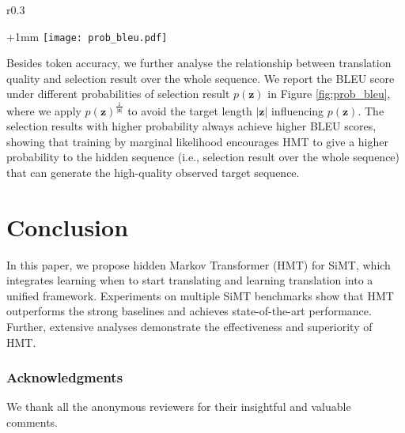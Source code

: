 \documentclass{article} %
\begin{document}
\setlength{\columnsep}{10pt}
\begin{wrapfigure}{r}{0.3\textwidth}
\begin{center}
\advance\leftskip+1mm
  \vspace{-0.3in} 
 \texttt{[image: prob\_bleu.pdf]}
   \vspace{-0.05in} 
  \caption{BLEU score with probability of selection result.}\label{fig:prob_bleu}
\vspace{-0.3in} 
\end{center}
\end{wrapfigure}
Besides token accuracy, we further analyse the relationship between translation quality and selection result over the whole sequence. We report the BLEU score \vspace{-1mm}under different probabilities of selection result $p\!\left (\mathbf{z}  \right )$ in Figure \ref{fig:prob_bleu}, where we apply $p\!\left (\mathbf{z}  \right )^{\frac{1}{\left|\mathbf{z} \right|}}$ to avoid the target length $\left|\mathbf{z} \right|$ influencing $p\!\left (\mathbf{z}  \right )$. The selection results with higher probability always achieve higher BLEU scores, showing that training by marginal likelihood encourages HMT to give a higher probability to the hidden sequence (i.e., selection result over the whole sequence) that can generate the high-quality observed target sequence.


\section{Conclusion}

In this paper, we propose hidden Markov Transformer (HMT) for SiMT, which integrates learning when to start translating and learning translation into a unified framework. Experiments on multiple SiMT benchmarks show that HMT outperforms the strong baselines and achieves state-of-the-art performance. Further, extensive analyses demonstrate the effectiveness and superiority of HMT.

\subsubsection*{Acknowledgments}
We thank all the anonymous reviewers for their insightful and valuable comments.





\newpage 

\appendix
\end{document}

